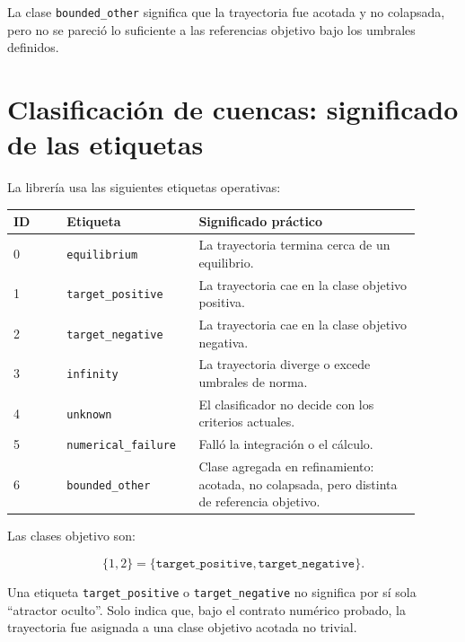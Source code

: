 \documentclass[11pt,letterpaper]{article}
\begin{document}
La clase \texttt{bounded\_other} significa que la trayectoria fue acotada y no colapsada, pero no se pareció lo suficiente a las referencias objetivo bajo los umbrales definidos.

\section{Clasificación de cuencas: significado de las etiquetas}

La librería usa las siguientes etiquetas operativas:

\begin{center}
\begin{tabular}{L{0.12\linewidth}L{0.28\linewidth}L{0.50\linewidth}}
\toprule
ID & Etiqueta & Significado práctico \\
 & \texttt{equilibrium} & La trayectoria termina cerca de un equilibrio. \\
1 & \texttt{target\_positive} & La trayectoria cae en la clase objetivo positiva. \\
2 & \texttt{target\_negative} & La trayectoria cae en la clase objetivo negativa. \\
3 & \texttt{infinity} & La trayectoria diverge o excede umbrales de norma. \\
4 & \texttt{unknown} & El clasificador no decide con los criterios actuales. \\
5 & \texttt{numerical\_failure} & Falló la integración o el cálculo. \\
6 & \texttt{bounded\_other} & Clase agregada en refinamiento: acotada, no colapsada, pero distinta de referencia objetivo. \\
\bottomrule
\end{tabular}
\end{center}

Las clases objetivo son:

\begin{equation}
\{1,2\}=\{\texttt{target\_positive},\texttt{target\_negative}\}.
\end{equation}

\begin{advertencia}
Una etiqueta \texttt{target\_positive} o \texttt{target\_negative} no significa por sí sola ``atractor oculto''. Solo indica que, bajo el contrato numérico probado, la trayectoria fue asignada a una clase objetivo acotada no trivial.
\end{advertencia}
\end{document}
